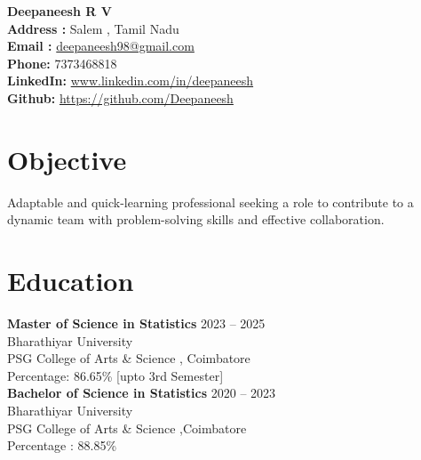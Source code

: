 \documentclass[a4paper,11pt]{article}
\begin{document}
	
	\begin{flushleft}
		{\LARGE \textbf{Deepaneesh R V}} \\
		\textbf{Address :} Salem , Tamil Nadu \\
		\textbf{Email :} \url{deepaneesh98@gmail.com}\\
		\textbf{Phone:} 7373468818 \\
		\textbf{LinkedIn:} \url{www.linkedin.com/in/deepaneesh} \\
		\textbf{Github:} \url{https://github.com/Deepaneesh} \\
	\end{flushleft}
	
	\section*{Objective}
	Adaptable and quick-learning professional seeking a role to contribute to a dynamic team with problem-solving skills and effective collaboration.
	
	\section*{Education}
	\noindent
	\textbf{Master of Science in Statistics} \hfill 2023 -- 2025 \\
	Bharathiyar University \\
	PSG College of Arts \& Science , Coimbatore \\
	Percentage: 86.65\% [upto 3rd Semester] \\[0.1mm]
	
	\textbf{Bachelor of Science in Statistics} \hfill 2020 -- 2023 \\
	Bharathiyar University \\
	PSG College of Arts \& Science ,Coimbatore\\
	Percentage : 88.85\% \\[0.01mm]
	
\end{document}
